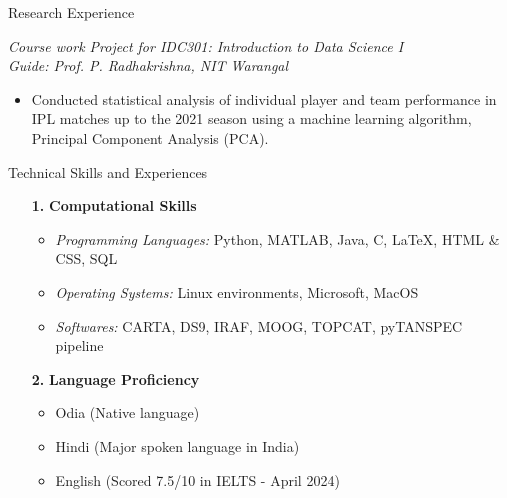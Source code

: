 \documentclass{resume} %
\begin{document}
\begin{rSection}{Research Experience}
\begin{enumerate}
    \textit{Course work Project for IDC301: Introduction to Data Science I\\Guide: Prof. P. Radhakrishna, NIT Warangal}
    \begin{itemize}
        \item Conducted statistical analysis of individual player and team performance in IPL matches up to the 2021 season using a machine learning algorithm, Principal Component Analysis (PCA).
    \end{itemize}
\end{enumerate}



\end{rSection}

\begin{rSection}{Technical Skills and Experiences}
\begin{enumerate}
    \item[\textbf{1.}] {\bf Computational Skills}
    \begin{itemize}
    \itemsep -3pt
        \item \textit{Programming Languages:} Python, MATLAB, Java, C, \LaTeX, HTML \& CSS, SQL
        \item \textit{Operating Systems:} Linux environments, Microsoft, MacOS
        \item \textit{Softwares:} CARTA, DS9, IRAF, MOOG, TOPCAT, pyTANSPEC pipeline
    \end{itemize}
    \item[\textbf{2.}] {\bf Language Proficiency}
    \begin{itemize}
    \itemsep -3pt
        \item Odia (Native language)
        \item Hindi (Major spoken language in India)
        \item English (Scored 7.5/10 in IELTS - April 2024)
    \end{itemize}
\end{enumerate}


\end{rSection}

\end{document}
